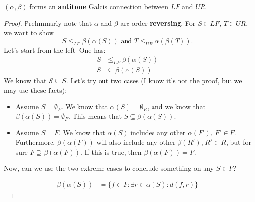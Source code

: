 \begin{lemma} $(\alpha, \beta)$ forms an  \textbf{antitone} Galois connection between $LF$ and $UR$.
\end{lemma}
\begin{proof}
Preliminarly note that $\alpha$ and $\beta$ are order \textbf{reversing}. For $S\in LF$, $T\in UR$, we want to show
\begin{equation}
    S\leq_{LF} \beta(\alpha(S)) \text{ and } T\leq_{UR} \alpha(\beta(T)).
\end{equation}
Let's start from the left. One has:
\begin{equation}
    \begin{aligned}
    S&\leq_{LF} \beta(\alpha(S))\\
    S&\subseteq \beta(\alpha(S))
    \end{aligned}
\end{equation}
We know that $S\subseteq S$. Let's try out two cases (I know it's not the proof, but we may use these facts):
\begin{itemize}
    \item Assume $S=\emptyset_F$. We know that $\alpha(S)=\emptyset_R$, and we know that $\beta(\alpha(S))=\emptyset_F$. This means that $S\subseteq \beta(\alpha(S))$. 
    \item Assume $S=F$. We know that $\alpha(S)$ includes any other $\alpha(F')$, $F' \in F$. Furthermore, $\beta(\alpha(F))$ will also include any other $\beta(R')$, $R'\in R$, but for sure $F\supseteq \beta(\alpha(F))$. If this is true, then $\beta(\alpha(F))=F$.
\end{itemize}
Now, can we use the two extreme cases to conclude something on any $S\in F$?

\begin{equation}
    \begin{aligned}
    \beta(\alpha(S))&=\{f\in F\colon \exists r\in \alpha(S)\colon d(f,r)\}
    \end{aligned}
\end{equation}



\end{proof}




